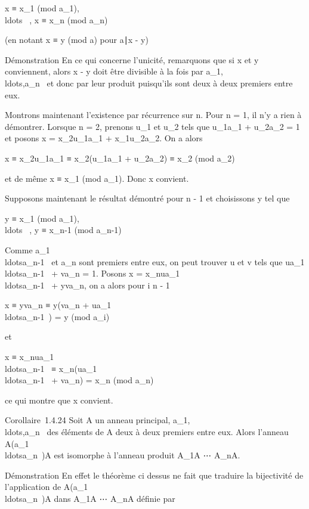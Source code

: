 x ≡ x_1
(mod\,\,a_1),\quad
\\ldots~\quad
, x ≡ x_n (mod\,\,a_n)

(en notant x ≡ y (mod\,\,a) pour
a∣x - y)

Démonstration En ce qui concerne l'unicité, remarquons que si x et y
conviennent, alors x - y doit être divisible à la fois par
a_1,\\ldots,a_n~
et donc par leur produit puisqu'ils sont deux à deux premiers entre eux.

Montrons maintenant l'existence par récurrence sur n. Pour n = 1, il n'y
a rien à démontrer. Lorsque n = 2, prenons u_1 et u_2
tels que u_1a_1 + u_2a_2 = 1 et
posons x = x_2u_1a_1 +
x_1u_2a_2. On a alors

x ≡ x_2u_1a_1 ≡
x_2(u_1a_1 + u_2a_2) ≡
x_2 (mod\,\,a_2)

et de même x ≡ x_1
(mod\,\,a_1). Donc x convient.

Supposons maintenant le résultat démontré pour n - 1 et choisissons y
tel que

y ≡ x_1
(mod\,\,a_1),\quad
\\ldots~\quad
, y ≡ x_n-1
(mod\,\,a_n-1)

Comme
a_1\\ldotsa_n-1~
et a_n sont premiers entre eux, on peut trouver u et v tels que
ua_1\\ldotsa_n-1~
+ va_n = 1. Posons x =
x_nua_1\\ldotsa_n-1~
+ yva_n, on a alors pour i \leq n - 1

x ≡ yva_n ≡ y(va_n +
ua_1\\ldotsa_n-1~)
= y (mod\,\,a_i)

et

x ≡
x_nua_1\\ldotsa_n-1~
≡
x_n(ua_1\\ldotsa_n-1~
+ va_n) = x_n
(mod\,\,a_n)

ce qui montre que x convient.

Corollaire~1.4.24 Soit A un anneau principal,
a_1,\\ldots,a_n~
des éléments de A deux à deux premiers entre eux. Alors l'anneau
A\diagup(a_1\\ldotsa_n~)A
est isomorphe à l'anneau produit A\diagupa_1A
\times⋯ \times A\diagupa_nA.

Démonstration En effet le théorème ci dessus ne fait que traduire la
bijectivité de l'application de
A\diagup(a_1\\ldotsa_n~)A
dans A\diagupa_1A \times⋯ \times A\diagupa_nA
définie par

